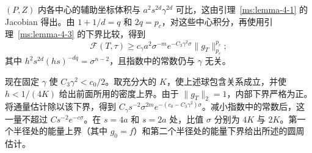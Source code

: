 $(P,Z)$ 内各中心的辅助坐标体积与 $a^2s^{2d}\gamma^{2d}$ 可比，这由引理~\ref{ms:lemma-4-1} 的 Jacobian 得出。由 $1+1/d=q$ 和 $2q=p_c$，对这些中心积分，再使用引理~\ref{ms:lemma-4-3} 的下界比较，得到
\[
\mathcal F(T,\tau)\ge c_\gamma a^2\sigma^{-m}e^{-C_3\gamma^2\sigma}\|g_T\|_{p_c}^{p_c};
\]
其中 $h^2s^{2d}(hs)^{-dq}=\sigma^{n-2}$，且指数中的常数仍与 $\gamma$ 无关。

现在固定 $\gamma$ 使 $C_3\gamma^2<c_0/2$。取充分大的 $K$，使上述球包含关系成立，并使 $h<1/(4K)$ 给出前面所用的密度上界。由于 $\|g_T\|_2=1$，内部下界严格为正。将通量估计除以该下界，得到 $C_\gamma s^{-2}\sigma^{2m}e^{-(c_0-C_3\gamma^2)\sigma}$。减小指数中的常数后，这一量不超过 $Cs^{-2}e^{-c\sigma}$。在 $s=4a$ 和 $s=2a$ 处，比值 $\sigma$ 分别为 $4K$ 与 $2K$。第一个半径处的能量上界（其中 $g_0=f$）和第二个半径处的能量下界给出所述的圆周估计。
